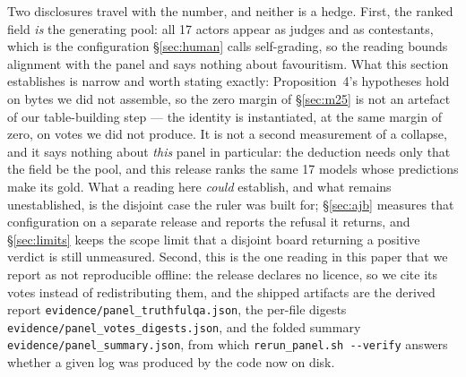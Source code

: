 \documentclass{article}
\newcommand{\ids}[1]{\texttt{\small #1}} %
\begin{document}
Two disclosures travel with the number, and neither is a hedge. First, the ranked field \emph{is} the
generating pool: all 17 actors appear as judges and as contestants, which is the configuration \S\ref{sec:human}
calls self-grading, so the reading bounds alignment with the panel and says nothing about favouritism.
What this section establishes is narrow and worth stating exactly: Proposition~4's hypotheses hold on bytes we
did not assemble, so the zero margin of \S\ref{sec:m25} is not an artefact of our table-building step --- the
identity is instantiated, at the same margin of zero, on votes we did not produce. It is not a second
measurement of a collapse, and it says nothing about \emph{this} panel in particular: the deduction needs only
that the field be the pool, and this release ranks the same 17 models whose predictions make its gold. What a
reading here \emph{could} establish, and what remains unestablished, is the disjoint case the ruler was built
for; \S\ref{sec:ajb} measures that configuration on a separate release and reports the refusal it returns, and
\S\ref{sec:limits} keeps the scope limit that a disjoint board returning a positive verdict is still unmeasured. Second, this is the one reading in this paper that we report as not reproducible offline: the
release declares no licence, so we cite its votes instead of redistributing them, and the shipped artifacts
are the derived report \ids{evidence/panel\_truthfulqa.json}, the per-file digests
\ids{evidence/panel\_votes\_digests.json}, and the folded summary \ids{evidence/panel\_summary.json}, from
which \ids{rerun\_panel.sh -{}-verify} answers whether a given log was produced by the code now on disk.
\end{document}
